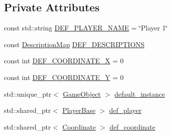 \subsection*{Private Attributes}
\begin{DoxyCompactItemize}
\item 
const std\-::string \hyperlink{classdefault__gameobjects_a0bdbe26cd36718ba9c628747c5323c55}{D\-E\-F\-\_\-\-P\-L\-A\-Y\-E\-R\-\_\-\-N\-A\-M\-E} = \char`\"{}Player 1\char`\"{}
\item 
const \hyperlink{namespaceCourse_aed04c39dde5a591d4b353686d3d0e306}{Description\-Map} \hyperlink{classdefault__gameobjects_abbebe0d0ab551b8e54391e90b360a514}{D\-E\-F\-\_\-\-D\-E\-S\-C\-R\-I\-P\-T\-I\-O\-N\-S}
\item 
const int \hyperlink{classdefault__gameobjects_a3d0f2d4c4dae2ebed8a97f4f1433bc31}{D\-E\-F\-\_\-\-C\-O\-O\-R\-D\-I\-N\-A\-T\-E\-\_\-\-X} = 0
\item 
const int \hyperlink{classdefault__gameobjects_aa473544da0a7d14b8f8f4e2e4b696441}{D\-E\-F\-\_\-\-C\-O\-O\-R\-D\-I\-N\-A\-T\-E\-\_\-\-Y} = 0
\item 
std\-::unique\-\_\-ptr$<$ \hyperlink{classCourse_1_1GameObject}{Game\-Object} $>$ \hyperlink{classdefault__gameobjects_a4dfa6f390ff4c2c331c342b6c88b16d7}{default\-\_\-instance}
\item 
std\-::shared\-\_\-ptr$<$ \hyperlink{classCourse_1_1PlayerBase}{Player\-Base} $>$ \hyperlink{classdefault__gameobjects_a66ae835be72c7ce9cc5cec3970cb0834}{def\-\_\-player}
\item 
std\-::shared\-\_\-ptr$<$ \hyperlink{classCourse_1_1Coordinate}{Coordinate} $>$ \hyperlink{classdefault__gameobjects_af9e1d7eca682f17b97659d34b973a1b6}{def\-\_\-coordinate}
\end{DoxyCompactItemize}


